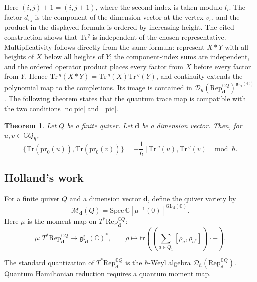 \documentclass[11pt,reqno]{amsart}
\newtheorem{theorem}{Theorem}[section]
\theoremstyle{definition}
\newcommand{\bbC}{\mathbb{C}}
\newcommand{\gl}{\mathfrak{gl}}
\newcommand{\GL}{\mathrm{GL}}
\newcommand{\tos}{\mapsto}
\newcommand{\Rep}{\mathrm{Rep}}
\newcommand{\Tr}{\mathrm{Tr} \,}
\newcommand{\bd}{\mathbf{d}}
\newcommand{\mD}{\mathcal{D}}
\newcommand{\qneck}{{\mathbb{C} \overline{Q}}_{\hbar}}
\newcommand{\Spec}{\mathrm{Spec}\,}
\newcommand{\tr}{\mathrm{tr}}
\newcommand{\mM}{\mathcal{M}}
\newcommand{\pr}{\mathrm{pr}}
\begin{document}
Here \((i,j)+1=(i,j+1)\), where the second index is taken modulo \(l_i\).
The factor \(d_{v_s}\) is the component of the dimension vector at the vertex \(v_s\), and the product in the displayed formula is ordered by increasing height.
The cited construction shows that \(\mathrm{Tr}^q\) is independent of
the chosen representative.  Multiplicativity follows directly from the
same formula: represent \(X*Y\) with all heights of \(X\) below all heights
of \(Y\); the component-index sums are independent, and the ordered
operator product places every factor from \(X\) before every factor from
\(Y\).  Hence \(\Tr^q(X*Y)=\Tr^q(X)\Tr^q(Y)\), and continuity extends the
polynomial map to the completions.  Its image is contained in
\(\mathcal D_\hbar(\Rep^{\bbC Q}_\bd)^{\gl_\bd(\bbC)}\).
The following theorem states that the quantum trace map is compatible with the two  conditions \eqref{nc  pic} and \eqref{ pic}.

\begin{theorem}\cite[Section~3.4]{Sch2005}
\label{thm: from nc  to }
Let \(Q\) be a finite quiver. Let \(\bd\) be a dimension vector.
	Then, for \(u,v\in\qneck\),
\begin{equation*}
	\{\mathrm{Tr}(\pr_0 (u)),\mathrm{Tr}( \pr_0 (v))\}  =
	-\frac1\hbar
	\left[
	\Tr^q(u),
	\Tr^q(v)
	\right]
	\bmod\hbar.
\end{equation*}
\end{theorem}





\subsection{Holland's work}\label{subsec: [Q,R]=0 on rep}

For a finite quiver \(Q\) and a dimension vector \(\bd\), define the quiver variety by
\[
\mM_\bd(Q)=\Spec\bbC[\mu^{-1}(0)]^{\GL_\bd(\bbC)}.
\]
Here \(\mu\) is the moment map on \(T^*\Rep^{\bbC Q}_\bd\):
\begin{equation*}
\mu\colon T^*\Rep^{\bbC Q}_\bd\longrightarrow\gl_\bd(\bbC)^*,
\qquad
\rho\tos\tr\!\left(\left(\sum_{a\in Q_1}[\rho_a,\rho_{a^*}]\right)\cdot-\right).
\end{equation*}

The standard quantization of \(T^*\Rep^{\bbC Q}_\bd\) is the \(\hbar\)-Weyl algebra \(\mD_\hbar(\Rep^{\bbC Q}_\bd)\). Quantum Hamiltonian reduction requires a quantum moment map.
\end{document}

